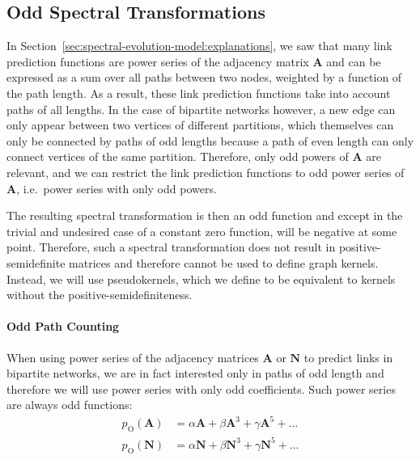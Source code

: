 \documentclass[11pt,a4paper]{book}
\begin{document}
\subsection{Odd Spectral Transformations}
\label{sec:asymmetry:bipartite:pseudokernels}
In Section~\ref{sec:spectral-evolution-model:explanations}, we saw that
many link prediction functions are power series of the adjacency matrix
$\mathbf A$ and can be expressed as a sum over all paths between two
nodes, weighted by a function of the path length.  As a result, these
link prediction functions take into account paths of all lengths.  
In
the case of bipartite networks however, 
a new edge can only appear between two vertices of different partitions,
which themselves can only be connected by paths of odd lengths because a
path of even length can only connect vertices of the same partition. 
Therefore, only odd
powers of $\mathbf A$ are relevant, and we can restrict the link
prediction functions to odd power series of $\mathbf A$, i.e.\ power
series with only odd powers.

The resulting spectral transformation is then an odd function and except
in the trivial and undesired case of a constant zero function, will be
negative at some point.  
Therefore, such a spectral transformation does not result in
positive-semidefinite matrices and therefore cannot be used to define
graph kernels. 
Instead, we will use pseudokernels, which we define to be equivalent
to kernels without the positive-semidefiniteness. 

\paragraph{Odd Path Counting}
When using power series of the adjacency matrices $\mathbf A$ or
$\mathbf N$ to predict links in bipartite networks, we are in fact
interested only in paths of odd length and therefore we will use power series
with only odd coefficients.  Such power series are always odd
functions: 
\begin{align}
  p_{\mathrm O}(\mathbf A) &=
  \alpha \mathbf A + \beta \mathbf A^3 + \gamma \mathbf A^5 + \ldots \label{eq:odd-path-counting} \\
  p_{\mathrm O}(\mathbf N) &=
  \alpha \mathbf N + \beta \mathbf N^3 + \gamma \mathbf N^5 + \ldots \label{eq:odd-normalized-path-counting} 
\end{align}
\end{document}
